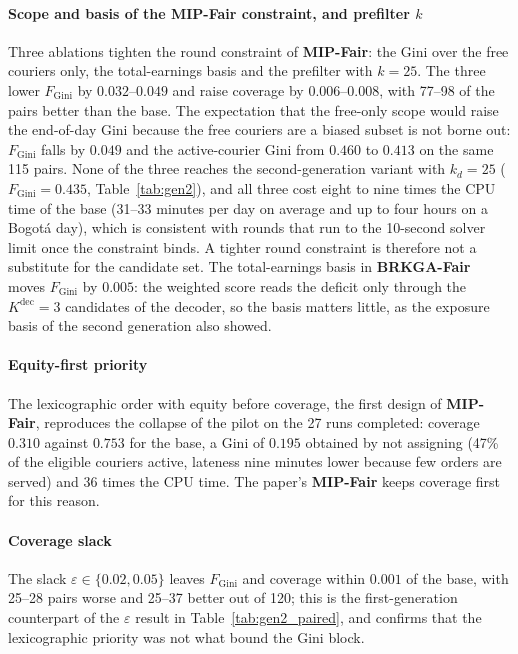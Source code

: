 \documentclass[a4paper,11pt,review,3p,authoryear]{elsarticle}
\newcommand{\FG}{F_{\text{Gini}}}
\begin{document}
\paragraph{Scope and basis of the \textbf{MIP-Fair} constraint, and prefilter $k$} Three ablations tighten the round constraint of \textbf{MIP-Fair}: the Gini over the free couriers only, the total-earnings basis and the prefilter with $k = 25$. The three lower $\FG$ by $0.032$--$0.049$ and raise coverage by $0.006$--$0.008$, with 77--98 of the pairs better than the base. The expectation that the free-only scope would raise the end-of-day Gini because the free couriers are a biased subset is not borne out: $\FG$ falls by $0.049$ and the active-courier Gini from $0.460$ to $0.413$ on the same 115 pairs. None of the three reaches the second-generation variant with $k_d = 25$ ($\FG = 0.435$, Table~\ref{tab:gen2}), and all three cost eight to nine times the CPU time of the base (31--33 minutes per day on average and up to four hours on a Bogot\'a day), which is consistent with rounds that run to the 10-second solver limit once the constraint binds. A tighter round constraint is therefore not a substitute for the candidate set. The total-earnings basis in \textbf{BRKGA-Fair} moves $\FG$ by $0.005$: the weighted score reads the deficit only through the $K^{\text{dec}} = 3$ candidates of the decoder, so the basis matters little, as the exposure basis of the second generation also showed.

\paragraph{Equity-first priority} The lexicographic order with equity before coverage, the first design of \textbf{MIP-Fair}, reproduces the collapse of the pilot on the 27 runs completed: coverage $0.310$ against $0.753$ for the base, a Gini of $0.195$ obtained by not assigning (47\% of the eligible couriers active, lateness nine minutes lower because few orders are served) and 36 times the CPU time. The paper's \textbf{MIP-Fair} keeps coverage first for this reason.

\paragraph{Coverage slack} The slack $\varepsilon \in \{0.02, 0.05\}$ leaves $\FG$ and coverage within $0.001$ of the base, with 25--28 pairs worse and 25--37 better out of 120; this is the first-generation counterpart of the $\varepsilon$ result in Table~\ref{tab:gen2_paired}, and confirms that the lexicographic priority was not what bound the Gini block.
\end{document}
